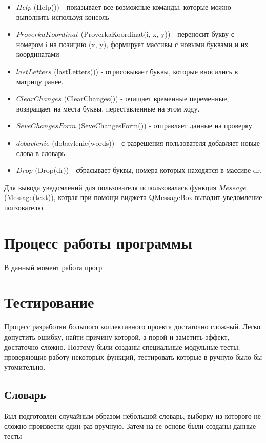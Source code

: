 \documentclass[a4paper,14pt]{article}
\begin{document}
	\begin {itemize}
	\item $Help$ (Help()) - показывает все возможные команды, которые можно выполнить используя консоль
	\item $ProverkaKoordinat$ (ProverkaKoordinat(i, x, y)) - переносит букву с номером i на позицию (x, y), формирует массивы с новыми буквами и их координатами	
	\item $lastLetters$ (lastLetters()) - отрисовывает буквы, которые вносились в матрицу ранее.
	\item $ClearChanges$ (ClearChanges()) - очищает временные переменные, возвращает на места буквы, переставленные на этом ходу.
	\item $SeveChangesForm$ (SeveChangesForm()) - отправляет данные на проверку.
	\item $dobavlenie$ (dobavlenie(words)) - с разрешения пользователя добавляет новые слова в словарь.
	\item $Drop$ (Drop(dr)) - сбрасывает буквы, номера которых находятся в массиве dr.
	\end {itemize}
	
	Для вывода уведомлений для пользователя использовалась функция $Message$ (Message(text)), котрая при помощи виджета QMessageBox выводит уведомление ползователю.

\section{Процесс работы программы}
	В данный момент работа прогр
		
\section{Тестирование}
	Процесс разработки большого коллективного проекта достаточно сложный. Легко допустить ошибку, найти причину которой, а порой и заметить эффект, достаточно сложно. Поэтому были созданы специальные модульные тесты, проверяющие работу некоторых функций, тестировать которые в ручную было бы утомительно.
	
	\subsection{Словарь}
	Был подготовлен случайным образом небольшой словарь, выборку из которого не сложно произвести один раз вручную. Затем на ее основе были созданы данные тесты
	
\end{document}
